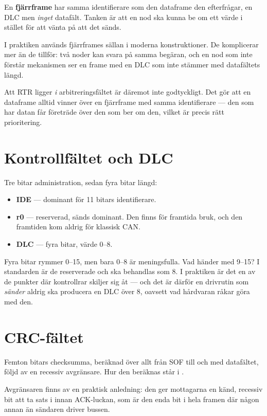 En \textbf{fjärrframe} har samma identifierare som den dataframe den efterfrågar, en DLC men
\emph{inget} datafält. Tanken är att en nod ska kunna be om ett värde i stället för att vänta på
att det sänds.

I praktiken används fjärrframes sällan i moderna konstruktioner. De komplicerar mer än de
tillför: två noder kan svara på samma begäran, och en nod som inte förstår mekanismen ser en
frame med en DLC som inte stämmer med datafältets längd.

Att RTR ligger \emph{i} arbitreringsfältet är däremot inte godtyckligt. Det gör att en dataframe
alltid vinner över en fjärrframe med samma identifierare --- den som har datan får företräde över
den som ber om den, vilket är precis rätt prioritering.

\section{Kontrollfältet och DLC}

Tre bitar administration, sedan fyra bitar längd:

\begin{itemize}
  \item \textbf{IDE} --- dominant för 11 bitars identifierare.
  \item \textbf{r0} --- reserverad, sänds dominant. Den finns för framtida bruk, och den
    framtiden kom aldrig för klassisk CAN.
  \item \textbf{DLC} --- fyra bitar, värde 0--8.
\end{itemize}

Fyra bitar rymmer 0--15, men bara 0--8 är meningsfulla. Vad händer med 9--15? I standarden är de
reserverade och ska behandlas som 8. I praktiken är det en av de punkter där kontrollrar skiljer
sig åt --- och det är därför en drivrutin som \emph{sänder} aldrig ska producera en DLC över 8,
oavsett vad hårdvaran råkar göra med den.

\section{CRC-fältet}

Femton bitars checksumma, beräknad över allt från SOF till och med datafältet, följd av en
recessiv avgränsare. Hur den beräknas står i .

Avgränsaren finns av en praktisk anledning: den ger mottagarna en känd, recessiv bit att ta
sats i innan ACK-luckan, som är den enda bit i hela framen där någon annan än sändaren driver
bussen.

